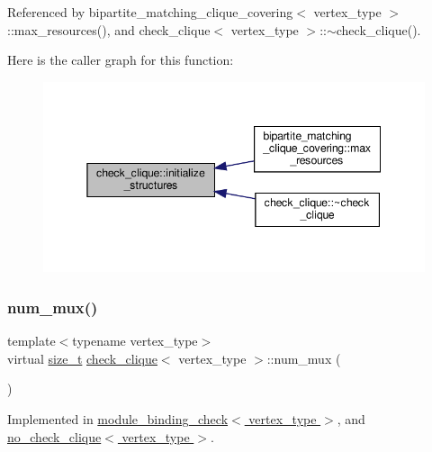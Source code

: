 Referenced by bipartite\+\_\+matching\+\_\+clique\+\_\+covering$<$ vertex\+\_\+type $>$\+::max\+\_\+resources(), and check\+\_\+clique$<$ vertex\+\_\+type $>$\+::$\sim$check\+\_\+clique().

Here is the caller graph for this function\+:
\nopagebreak
\begin{figure}[H]
\begin{center}
\leavevmode
\includegraphics[width=345pt]{d9/d11/structcheck__clique_a8355d3ba6eb71d487ffc36d48274db73_icgraph}
\end{center}
\end{figure}
\mbox{\label{structcheck__clique_af124519bb9bb0f5476b38a20b8a7303b}} 
\subsubsection{\texorpdfstring{num\+\_\+mux()}{num\_mux()}}
{\footnotesize\ttfamily template$<$typename vertex\+\_\+type$>$ \\
virtual \hyperlink{tutorial__fpt__2017_2intro_2sixth_2test_8c_a7c94ea6f8948649f8d181ae55911eeaf}{size\+\_\+t} \hyperlink{structcheck__clique}{check\+\_\+clique}$<$ vertex\+\_\+type $>$\+::num\+\_\+mux (\begin{DoxyParamCaption}{ }\end{DoxyParamCaption})\hspace{0.3cm}{\ttfamily [pure virtual]}}



Implemented in \hyperlink{structmodule__binding__check_af4e3de311ec8e1aa996ebf0655faf0c5}{module\+\_\+binding\+\_\+check$<$ vertex\+\_\+type $>$}, and \hyperlink{structno__check__clique_a1cd60108ede385b43774d331e407a4dc}{no\+\_\+check\+\_\+clique$<$ vertex\+\_\+type $>$}.




